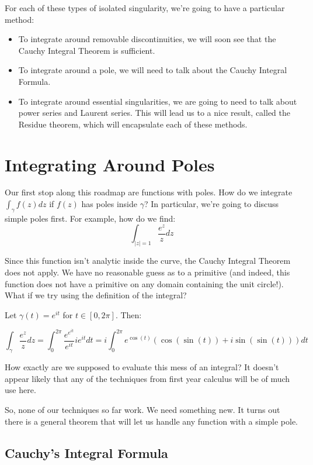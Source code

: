 For each of these types of isolated singularity, we're going to have a particular method:

\begin{itemize} \item To integrate around removable discontinuities, we will soon see that the Cauchy Integral Theorem is sufficient.
\item To integrate around a pole, we will need to talk about the Cauchy Integral Formula.
\item To integrate around essential singularities, we are going to need to talk about power series and Laurent series. This will lead us to a nice result, called the Residue theorem, which will encapsulate each of these methods.
\end{itemize}

\section{Integrating Around Poles}

Our first stop along this roadmap are functions with poles. How do we integrate $\int_\gamma f(z)dz$ if $f(z)$ has poles inside $\gamma$? In particular, we're going to discuss simple poles first. For example, how do we find:
$$\int_{|z| = 1} \frac{e^z}{z}dz$$

Since this function isn't analytic inside the curve, the Cauchy Integral Theorem does not apply. We have no reasonable guess as to a primitive (and indeed, this function does not have a primitive on any domain containing the unit circle!). What if we try using the definition of the integral?

\begin{ex}{}{} Let $\gamma(t) = e^{it}$ for $t\in [0,2\pi]$. Then:

$$\int_{\gamma} \frac{e^z}{z}dz = \int_0^{2\pi} \frac{e^{e^{it}}}{e^{it}}ie^{it}dt = i\int_0^{2\pi} e^{\cos(t)}(\cos(\sin(t)) + i\sin(\sin(t)))dt$$

How exactly are we supposed to evaluate this mess of an integral? It doesn't appear likely that any of the techniques from first year calculus will be of much use here.\end{ex}

So, none of our techniques so far work. We need something new. It turns out there is a general theorem that will let us handle any function with a simple pole.


\subsection{Cauchy's Integral Formula}

